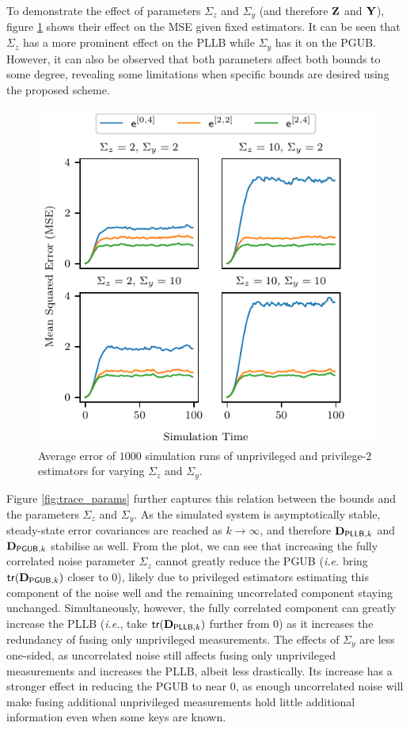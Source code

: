 \documentclass[letterpaper, 10 pt, conference]{ieeeconf}
\begin{document}
To demonstrate the effect of parameters $\Sigma_z$ and $\Sigma_y$ (and therefore ${{\mathbf{Z}}}$ and ${{\mathbf{Y}}}$), figure \ref{fig:mse_params} shows their effect on the MSE given fixed estimators. It can be seen that $\Sigma_z$ has a more prominent effect on the PLLB while $\Sigma_y$ has it on the PGUB. However, it can also be observed that both parameters affect both bounds to some degree, revealing some limitations when specific bounds are desired using the proposed scheme.
\begin{figure}[htbp]
  \centering
  \includegraphics{figures/mse_params.pdf}
  \caption{Average error of $1000$ simulation runs of unprivileged and privilege-$2$ estimators for varying $\Sigma_z$ and $\Sigma_y$.}
  \label{fig:mse_params}
\end{figure}
Figure \ref{fig:trace_params} further captures this relation between the bounds and the parameters $\Sigma_z$ and $\Sigma_y$. As the simulated system is asymptotically stable, steady-state error covariances are reached as $k \to \infty$, and therefore ${{\mathbf{D}}}_{\mathsf{PLLB},k}$ and ${{\mathbf{D}}}_{\mathsf{PGUB},k}$ stabilise as well. From the plot, we can see that increasing the fully correlated noise parameter $\Sigma_z$ cannot greatly reduce the PGUB (\textit{i.e.} bring $\mathsf{tr}({{\mathbf{D}}}_{\mathsf{PGUB},k})$ closer to $0$), likely due to privileged estimators estimating this component of the noise well and the remaining uncorrelated component staying unchanged. Simultaneously, however, the fully correlated component can greatly increase the PLLB (\textit{i.e.}, take $\mathsf{tr}({{\mathbf{D}}}_{\mathsf{PLLB},k})$ further from $0$) as it increases the redundancy of fusing only unprivileged measurements. The effects of $\Sigma_y$ are less one-sided, as uncorrelated noise still affects fusing only unprivileged measurements and increases the PLLB, albeit less drastically. Its increase has a stronger effect in reducing the PGUB to near $0$, as enough uncorrelated noise will make fusing additional unprivileged measurements hold little additional information even when some keys are known.
\end{document}
